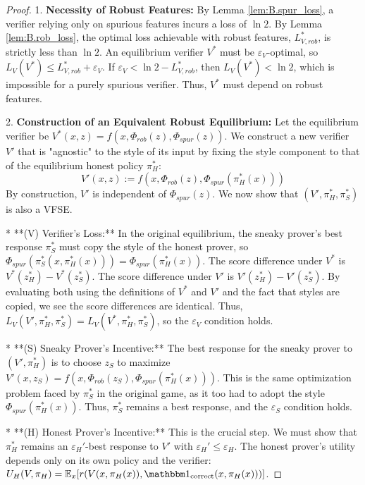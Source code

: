 \begin{proof}
1.  \textbf{Necessity of Robust Features:} By Lemma \ref{lem:B.spur_loss}, a verifier relying only on spurious features incurs a loss of $\ln 2$. By Lemma \ref{lem:B.rob_loss}, the optimal loss achievable with robust features, $L_{V,rob}^*$, is strictly less than $\ln 2$. An equilibrium verifier $V^*$ must be $\varepsilon_V$-optimal, so $L_V(V^*) \le L_{V,rob}^* + \varepsilon_V$. If $\varepsilon_V < \ln 2 - L_{V,rob}^*$, then $L_V(V^*) < \ln 2$, which is impossible for a purely spurious verifier. Thus, $V^*$ must depend on robust features.

2.  \textbf{Construction of an Equivalent Robust Equilibrium:} Let the equilibrium verifier be $V^*(x, z) = f(x, \Phi_{rob}(z), \Phi_{spur}(z))$. We construct a new verifier $V'$ that is "agnostic" to the style of its input by fixing the style component to that of the equilibrium honest policy $\pi_H^*$:
    \[
    V'(x, z) := f(x, \Phi_{rob}(z), \Phi_{spur}(\pi_H^*(x)))
    \]
    By construction, $V'$ is independent of $\Phi_{spur}(z)$. We now show that $(V', \pi_H^*, \pi_S^*)$ is also a VFSE.

    *   **(V) Verifier's Loss:** In the original equilibrium, the sneaky prover's best response $\pi_S^*$ must copy the style of the honest prover, so $\Phi_{spur}(\pi_S^*(x, \pi_H^*(x))) = \Phi_{spur}(\pi_H^*(x))$. The score difference under $V^*$ is $V^*(z_H^*) - V^*(z_S^*)$. The score difference under $V'$ is $V'(z_H^*) - V'(z_S^*)$. By evaluating both using the definitions of $V^*$ and $V'$ and the fact that styles are copied, we see the score differences are identical. Thus, $L_V(V', \pi_H^*, \pi_S^*) = L_V(V^*, \pi_H^*, \pi_S^*)$, so the $\varepsilon_V$ condition holds.

    *   **(S) Sneaky Prover's Incentive:** The best response for the sneaky prover to $(V', \pi_H^*)$ is to choose $z_S$ to maximize $V'(x, z_S) = f(x, \Phi_{rob}(z_S), \Phi_{spur}(\pi_H^*(x)))$. This is the same optimization problem faced by $\pi_S^*$ in the original game, as it too had to adopt the style $\Phi_{spur}(\pi_H^*(x))$. Thus, $\pi_S^*$ remains a best response, and the $\varepsilon_S$ condition holds.

    *   **(H) Honest Prover's Incentive:** This is the crucial step. We must show that $\pi_H^*$ remains an $\varepsilon_H'$-best response to $V'$ with $\varepsilon_H' \le \varepsilon_H$. The honest prover's utility depends only on its own policy and the verifier: $U_H(V, \pi_H) = \mathbb{E}_x[r(V(x, \pi_H(x)), \corr(x, \pi_H(x)))]$.


\end{proof}
